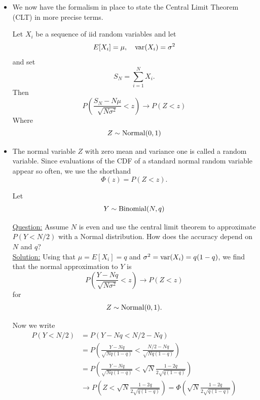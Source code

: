   
\begin{itemize}
\item We now have the formalism in place to state the Central Limit Theorem (CLT) in more precise terms. 
 \begin{thm} Let $X_i$ be a sequence of iid random variables and let 
 \begin{equation*}
E[X_i] = \mu,\quad  {\rm var}(X_i) = \sigma^2
 \end{equation*}
  and set 
  \begin{equation*}
 S_N = \sum_{i=1}^N X_i.
 \end{equation*}
 Then 
 \begin{equation}\label{eq:clt}
P\left( \frac{S_N-N\mu}{\sqrt{N \sigma^2}}<z\right) \to P(Z<z) 
 \end{equation}
Where
\begin{equation*}
Z \sim {\rm Normal}(0,1)
\end{equation*}
 \end{thm}
 \item The normal variable $Z$ with zero mean and variance one is called a  random variable. Since evaluations of the CDF of a standard normal random variable appear so often, we use the shorthand 
 \begin{equation*}
 \Phi(z) = P(Z<z).
 \end{equation*}

 
\begin{example}[Binomial] Let 
\begin{equation*}
Y \sim {\rm Binomial}(N,q)
\end{equation*}


 \noindent
\underline{Question:} Assume $N$ is even and use the central limit theorem to approximate $P(Y<N/2)$ with a Normal distribution. How does the accuracy depend on $N$ and $q$? \\

 \noindent
\underline{Solution:} Using that $\mu = E[X_i] = q$ and $\sigma^2 = {\rm var}(X_i) = q(1-q)$, we find that the normal approximation to $Y$ is 
\begin{equation*}
P\left( \frac{Y - Nq}{\sqrt{N \sigma^2}} <z\right) \to P(Z<z)
\end{equation*}
for 
\begin{equation*}
Z \sim {\rm Normal}(0,1). 
\end{equation*}

Now we write
\begin{align*}
P\left( Y<N/2\right) &= P\left(Y - Nq <N/2-Nq\right) \\
&= P\left(\frac{Y - Nq}{\sqrt{N q(1-q)}} <\frac{N/2-Nq}{\sqrt{N q(1-q)}}\right)\\
&= P\left(\frac{Y - Nq}{\sqrt{N q(1-q)}} < \sqrt{N} \frac{1-2q}{2\sqrt{q(1-q)}}\right)\\
&\to P\left(Z < \sqrt{N} \frac{1-2q}{2\sqrt{q(1-q)}}\right) = \Phi\left( \sqrt{N} \frac{1-2q}{2\sqrt{q(1-q)}}\right)
\end{align*}



\end{example}
\end{itemize}
